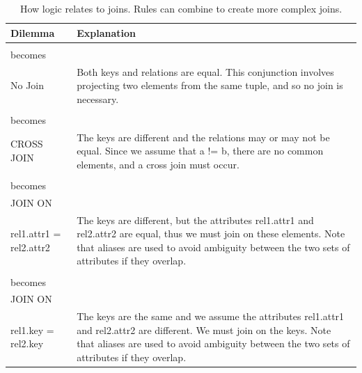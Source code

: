 \documentclass[a4paper, 11pt]{article}
\begin{document}
      \begin{table}
        \label{table:jointranslation}
        \begin{tabular}{ | 
          p{} |
          p{} |
        }
        
        \hline
        Dilemma & Explanation \\
        \hline

        \tabbox{\centering $rel.attr1(k, a) \land rel.attr2(k, b)$ \\ becomes \\  No Join} 
        & 
        Both keys and relations are equal. This conjunction involves projecting
        two elements from the same tuple, and so no join is necessary.
        \\\hline
        
        \tabbox{\centering $rel1.attr1(k1, a) \land rel2.attr2(k2, b)$ \\ becomes \\ CROSS JOIN} 
        & 
        The keys are different and the relations may or may not be equal. Since
        we assume that a != b, there are no common elements, and a cross join
        must occur.
        \\\hline
        
        \tabbox{\centering $rel1.attr1(k1, a) \land rel2.attr2(k2, a)$ \\ becomes \\ JOIN ON \\ rel1.attr1 =
        rel2.attr2} 
        & 
        The keys are different, but the attributes rel1.attr1 and rel2.attr2
        are equal, thus we must join on these elements. Note that aliases are
        used to avoid ambiguity between the two sets of attributes if they
        overlap.
        \\\hline
        
        \tabbox{\centering $rel1.attr1(k, a) \land rel2.attr2(k, b)$ \\ becomes \\ JOIN ON \\ rel1.key =
        rel2.key}
        & 
        The keys are the same and we assume the attributes rel1.attr1 and rel2.attr2
        are different. We must join on the keys. Note that aliases are
        used to avoid ambiguity between the two sets of attributes if they
        overlap.
        \\\hline
        
      \end{tabular}
        \caption{How logic relates to joins. Rules can combine to create more
        complex joins.}
    \end{table}
\end{document}
